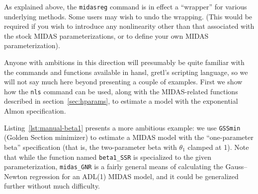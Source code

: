 \documentclass{article}
\begin{document}
As explained above, the \texttt{midasreg} command is in effect a
``wrapper'' for various underlying methods. Some users may wish to
undo the wrapping. (This would be required if you wish to introduce
any nonlinearity other than that associated with the stock MIDAS
parameterizations, or to define your own MIDAS parameterization).

Anyone with ambitions in this direction will presumably be quite
familiar with the commands and functions available in hansl, gretl's
scripting language, so we will not say much here beyond presenting a
couple of examples. First we show how the \texttt{nls} command can be
used, along with the MIDAS-related functions described in
section~\ref{sec:hparams}, to estimate a model with the exponential
Almon specification.
%

Listing~\ref{lst:manual-beta1} presents a more ambitious example: we
use \texttt{GSSmin} (Golden Section minimizer) to estimate a MIDAS
model with the ``one-parameter beta'' specification (that is, the
two-parameter beta with $\theta_1$ clamped at 1). Note that while the
function named \texttt{beta1\_SSR} is specialized to the given
parameterization, \texttt{midas\_GNR} is a fairly general means of
calculating the Gauss--Newton regression for an ADL(1) MIDAS
model, and it could be generalized further without much difficulty.
\end{document}
